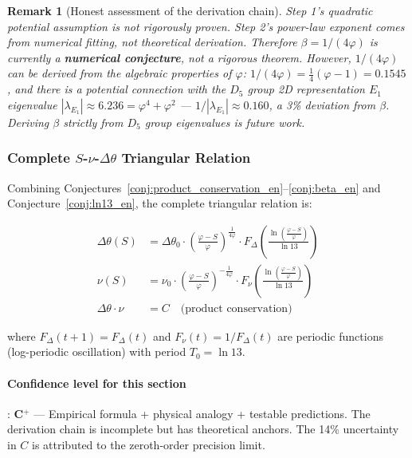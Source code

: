 \documentclass[12pt,a4paper,twocolumn]{article}
\renewcommand{\phi}{\varphi}
\newtheorem{remark}[theorem]{Remark}
\begin{document}
\begin{remark}[Honest assessment of the derivation chain]
Step 1's quadratic potential assumption is not rigorously proven. Step 2's power-law exponent comes from numerical fitting, not theoretical derivation. Therefore $\beta = 1/(4\phi)$ is currently a \textbf{numerical conjecture}, not a rigorous theorem. However, $1/(4\phi)$ can be derived from the algebraic properties of $\phi$: $1/(4\phi) = \frac{1}{4}(\phi - 1) = 0.1545$, and there is a potential connection with the $D_5$ group 2D representation $E_1$ eigenvalue $|\lambda_{E_1}| \approx 6.236 = \phi^4 + \phi^2$ --- $1/|\lambda_{E_1}| \approx 0.160$, a 3\% deviation from $\beta$. Deriving $\beta$ strictly from $D_5$ group eigenvalues is future work.
\end{remark}

\subsubsection{Complete $S$-$\nu$-$\Delta\theta$ Triangular Relation}

Combining Conjectures~\ref{conj:product_conservation_en}--\ref{conj:beta_en} and Conjecture~\ref{conj:ln13_en}, the complete triangular relation is:

\begin{equation}
\boxed{
\begin{aligned}
\Delta\theta(S) &= \Delta\theta_0 \cdot \left(\frac{\phi - S}{\phi}\right)^{\frac{1}{4\phi}} \cdot F_\Delta\!\left(\frac{\ln\!\left(\frac{\phi-S}{\phi}\right)}{\ln 13}\right) \\[6pt]
\nu(S) &= \nu_0 \cdot \left(\frac{\phi - S}{\phi}\right)^{-\frac{1}{4\phi}} \cdot F_\nu\!\left(\frac{\ln\!\left(\frac{\phi-S}{\phi}\right)}{\ln 13}\right) \\[6pt]
\Delta\theta \cdot \nu &= C \quad \text{(product conservation)}
\end{aligned}
}
\label{eq:triangle_relation_en}
\end{equation}

where $F_\Delta(t+1) = F_\Delta(t)$ and $F_\nu(t) = 1/F_\Delta(t)$ are periodic functions (log-periodic oscillation) with period $T_0 = \ln 13$.

\paragraph{Confidence level for this section}: \textbf{C$^+$} --- Empirical formula + physical analogy + testable predictions. The derivation chain is incomplete but has theoretical anchors. The 14\% uncertainty in $C$ is attributed to the zeroth-order precision limit.
\end{document}
